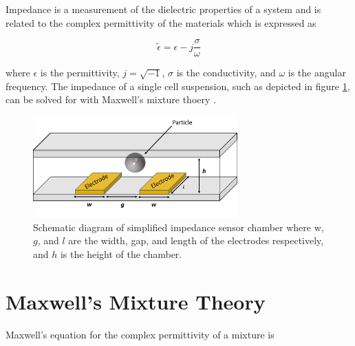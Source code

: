 
\label{app:analytic_impedance_solution}

\par Impedance is a measurement of the dielectric properties of a system and is related to the complex permittivity of the materials which is expressed as

\begin{equation}
    \tilde{\epsilon} = \epsilon - j\frac{\sigma}{\omega}
\end{equation}

\noindent where $\epsilon$ is the permittivity, $j = \sqrt{-1}$, $\sigma$ is the conductivity, and $\omega$ is the angular frequency. The impedance of a single cell suspension, such as depicted in figure \ref{fig:simplified_IS}, can be solved for with Maxwell's mixture thoery \cite{james_clerk_maxwell_treatise_1892, sun_single-cell_2010}.

\begin{figure}[ht]
 \centering
 \includegraphics[width=0.7\textwidth]{images/cellAndElectrodes.png}
 \caption[Schematic diagram of simplified impedance sensor chamber.]{Schematic diagram of simplified impedance sensor chamber where w, $g$, and $l$ are the width, gap, and length of the electrodes respectively, and $h$ is the height of the chamber.}
 \label{fig:simplified_IS}
 \end{figure}
 
 

\section{Maxwell's Mixture Theory}
 
 Maxwell's equation for the complex permittivity of a mixture is
  
